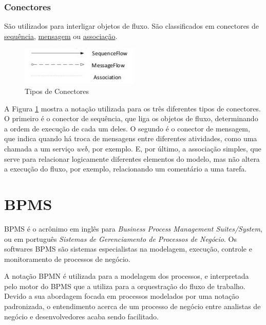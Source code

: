 \subsubsection{Conectores}\label{sec:bpm-bpmn_objetos_conectores}

    São utilizados para interligar objetos de fluxo. São classificados em conectores de \underline{sequência}, \underline{mensagem} ou \underline{associação}.

    \begin{figure}[H]
    \centering
    \includegraphics[width=0.5\textwidth]{imagens/bpmn_connectors.jpg}
    \caption{Tipos de Conectores\cite{tipos_conectores}}
    \label{fig:bpmn_conectors}
    \end{figure}
    
    A Figura \ref{fig:bpmn_conectors} mostra a notação utilizada para os três diferentes tipos de conectores. O primeiro é o conector de sequência, que liga os objetos de fluxo, determinando a ordem de execução de cada um deles. O segundo é o conector de mensagem, que indica quando há troca de mensagens entre diferentes atividades, como uma chamada a um serviço \textit{web}, por exemplo. E, por último, a associação simples, que serve para relacionar logicamente diferentes elementos do modelo, mas não altera a execução do fluxo, por exemplo, relacionando um comentário a uma tarefa. 


\section{BPMS}\label{sec:automatizacao-processos-bpms}

BPMS\cite{bpms} é o acrônimo em inglês para \textit{Business Process Management Suites/System}, ou em português \textit{Sistemas de Gerenciamento de Processos de Negócio}. Os softwares BPMS são sistemas especialistas na modelagem, execução, controle e monitoramento de processos de negócio. 

A notação BPMN é utilizada para a modelagem dos processos, e interpretada pelo motor do BPMS que a utiliza para a orquestração do fluxo de trabalho. Devido a sua abordagem focada em processos modelados por uma notação padronizada, o entendimento acerca de um processo de negócio entre analistas de negócio e desenvolvedores acaba sendo facilitado. 

